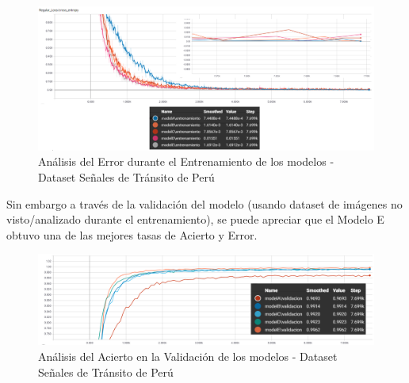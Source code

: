 			\begin{figure}[H]
				\includegraphics[width=1\textwidth, height=\textheight,keepaspectratio]{images/desarrollo/trainResults/peruSummary_entreError} 
				\begin{center}
				\caption{\small{Análisis del Error durante el Entrenamiento de los modelos - Dataset Señales de Tránsito de Perú}}
				
				{\small{\fontsize{10}{16.8}\selectfont {Fuente: Elaboración propia}}}
				\end{center}
				\vspace{-1.5em}
			\end{figure}	


			Sin embargo a través de la validación del modelo (usando dataset de imágenes no visto/analizado durante el entrenamiento), se puede apreciar que el Modelo E obtuvo una de las mejores tasas de Acierto y Error. 

			\begin{figure}[H]
				\includegraphics[width=1\textwidth, height=\textheight,keepaspectratio]{images/desarrollo/trainResults/peruSummary_validAcierto} 
				\begin{center}
				\caption{\small{Análisis del Acierto en la Validación de los modelos - Dataset Señales de Tránsito de Perú}}
				
				{\small{\fontsize{10}{16.8}\selectfont {Fuente: Elaboración propia}}}
				\end{center}
				\vspace{-1.5em}
			\end{figure}


